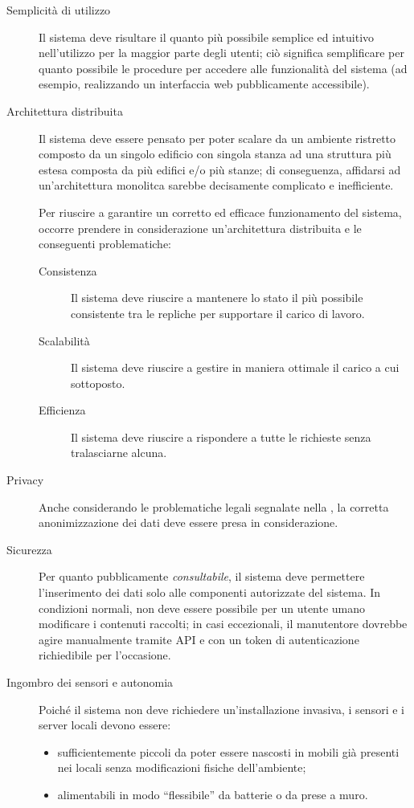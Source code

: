 \begin{description}
  \item[Semplicità di utilizzo]
    Il sistema deve risultare il quanto più possibile semplice ed intuitivo nell'utilizzo per la maggior parte degli utenti;
    ciò significa semplificare per quanto possibile le procedure per accedere alle funzionalità del sistema (ad esempio, realizzando un interfaccia web pubblicamente accessibile).
  \item[Architettura distribuita]
    Il sistema deve essere pensato per poter scalare da un ambiente ristretto composto da un singolo edificio con singola stanza ad una struttura più estesa composta da più edifici e/o più stanze;
    di conseguenza, affidarsi ad un'architettura monolitca sarebbe decisamente complicato e inefficiente.

    Per riuscire a garantire un corretto ed efficace funzionamento del sistema, occorre prendere in considerazione un'architettura distribuita e le conseguenti problematiche:

    \begin{description}
      \item[Consistenza]
        Il sistema deve riuscire a mantenere lo stato il più possibile consistente tra le repliche per supportare il carico di lavoro.
      \item[Scalabilità]
        Il sistema deve riuscire a gestire in maniera ottimale il carico a cui sottoposto.
      \item[Efficienza]
        Il sistema deve riuscire a rispondere a tutte le richieste senza tralasciarne alcuna.
    \end{description}

  \item[Privacy]
    Anche considerando le problematiche legali segnalate nella , la corretta anonimizzazione dei dati deve essere presa in considerazione.
  \item[Sicurezza]
    Per quanto pubblicamente \emph{consultabile}, il sistema deve permettere l'inserimento dei dati solo alle componenti autorizzate del sistema.
    In condizioni normali, non deve essere possibile per un utente umano modificare i contenuti raccolti;
    in casi eccezionali, il manutentore dovrebbe agire manualmente tramite API e con un token di autenticazione richiedibile per l'occasione.
  \item[Ingombro dei sensori e autonomia]
    Poiché il sistema non deve richiedere un'installazione invasiva, i sensori e i server locali devono essere:
    \begin{itemize}
      \item sufficientemente piccoli da poter essere nascosti in mobili già presenti nei locali senza modificazioni fisiche dell'ambiente;
      \item alimentabili in modo ``flessibile'' da batterie o da prese a muro.
    \end{itemize}
\end{description}
